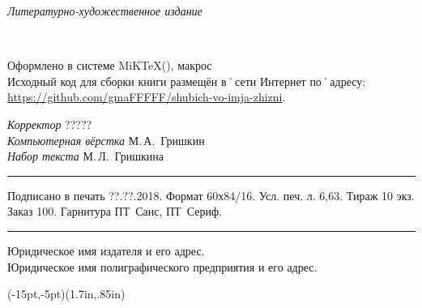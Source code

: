 ﻿\clearpage

\thispagestyle{empty}
\noindent\begin{center}
	{\itshape Литературно-художественное издание\par}
\end{center}	

\vfill\noindent
\begin{center}
	{\large{\bfseries\MakeUppercase{\AuthorFam}} \AuthorName\\[3ex]}				
	{\LARGE\Title}
\end{center}

\vfill\noindent
\begin{center}
	Оформлено в системе MiK\TeX(\LaTeXe), макрос \KOMAScript\\[1ex]
	Исходный код для сборки книги размещён в˚сети Интернет по˚адресу: \url{https://github.com/gmaFFFFF/shubich-vo-imja-zhizni}.
\end{center}
	
\vfill\noindent
\begin{center}
	\small 
	{\itshape Корректор} ?????\\[1ex]
	{\itshape Компьютерная вёрстка} М.\,А.~Гришкин\\[1ex]
	{\itshape Набор текста} М.\,Л.~Гришкина\\[1ex]
\end{center}

\vfill\noindent
\rule{\textwidth}{.5pt}
\begin{center}
	\small Подписано в печать  ??.??.2018. Формат 60х84/16. Усл. печ. л. 6,63. Тираж 10 экз. Заказ 100. Гарнитура ПТ~Санс, ПТ~Сериф.		
\end{center}
\rule{\textwidth}{.5pt}

\vfil\noindent		
\begin{center}
		\small
		
		Юридическое имя издателя и его адрес.\\[1ex]
				
		Юридическое имя полиграфического предприятия и его адрес.
\end{center}

\vfil
\noindent\begin{center}
	\begin{pspicture}(-15pt,-5pt)(1.7in,.85in)
	\end{pspicture}
\end{center}	

\clearpage
\thispagestyle{empty}
\label{myLastPage}
\null
\clearpage